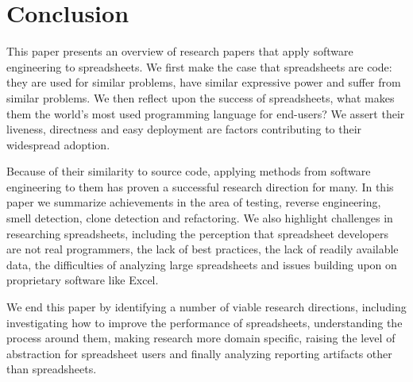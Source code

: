 \documentclass[conference]{IEEEtran}
\begin{document}
\balance

\section{Conclusion}
This paper presents an overview of research papers that apply software engineering to spreadsheets. We first make the case that spreadsheets are code: they are used for similar problems, have similar expressive power and suffer from similar problems. We then reflect upon the success of spreadsheets, what makes them the world's most used programming language for end-users? We assert their liveness, directness and easy deployment are factors contributing to their widespread adoption. 

Because of their similarity to source code, applying methods from software engineering to them has proven a successful research direction for many. In this paper we summarize achievements in the area of testing, reverse engineering, smell detection, clone detection and refactoring. We also highlight challenges in researching spreadsheets, including the perception that spreadsheet developers are not real programmers, the lack of best practices, the lack of readily available data, the difficulties of analyzing large spreadsheets and issues building upon on proprietary software like Excel.

We end this paper by identifying a number of viable research directions, including investigating how to improve the performance of spreadsheets, understanding the process around them, making research more domain specific, raising the level of abstraction for spreadsheet users and finally analyzing reporting artifacts other than spreadsheets.

\balance









\end{document}

